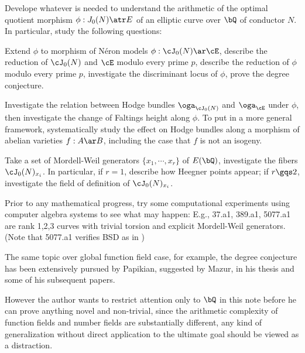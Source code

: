 \documentclass[article, a4paper, twoside]{universal}
\begin{document}
\confighead{}{}{}





 Develope whatever is needed to understand the arithmetic of the optimal quotient morphism $\phi:J_{0}(N)\atr E$ of an elliptic curve over $\bQ$ of conductor $N$. In particular, study the following questions:
\begin{itm}
	\item[\TODO] Extend $\phi$ to morphism of N{\'e}ron models $\phi:\cJ_{0}(N)\ar\cE$, describe the reduction of $\cJ_{0}(N)$ and $\cE$ modulo every prime $p$, describe the reduction of $\phi$ modulo every prime $p$, investigate the discriminant locus of $\phi$, prove the degree conjecture.
	\item[\TODO] Investigate the relation between Hodge bundles $\oga_{\cJ_{0}(N)}$ and $\oga_{\cE}$ under $\phi$, then investigate the change of Faltings height along $\phi$. To put in a more general framework, systematically study the effect on Hodge bundles along a morphism of abelian varieties $f:A\ar B$, including the case that $f$ is not an isogeny.
	\item[\TODO] Take a set of Mordell-Weil generators $\{x_{1},\cdots,x_{r}\}$ of $E(\bQ)$, investigate the fibers $\cJ_{0}(N)_{x_{i}}$. In particular, if $r=1$, describe how Heegner points appear; if $r\gqs2$, investigate the field of definition of $\cJ_{0}(N)_{x_{i}}$.

	Prior to any mathematical progress, try some computational experiments using computer algebra systems to see what may happen: E.g., 37.a1, 389.a1, 5077.a1 are rank 1,2,3 curves with trivial torsion and explicit Mordell-Weil generators. (Note that 5077.a1 verifies BSD as in \cite{BGZ1985})
\end{itm}

\begin{rmk}
	The same topic over global function field case, for example, the degree conjecture has been extensively pursued by Papikian, suggested by Mazur, in his thesis\cite{Papikian2003} and some of his subsequent papers.

	However the author wants to restrict attention only to $\bQ$ in this note before he can prove anything novel and non-trivial, since the arithmetic complexity of function fields and number fields are substantially different, any kind of generalization without direct application to the ultimate goal should be viewed as a distraction.
\end{rmk}
\end{document}
